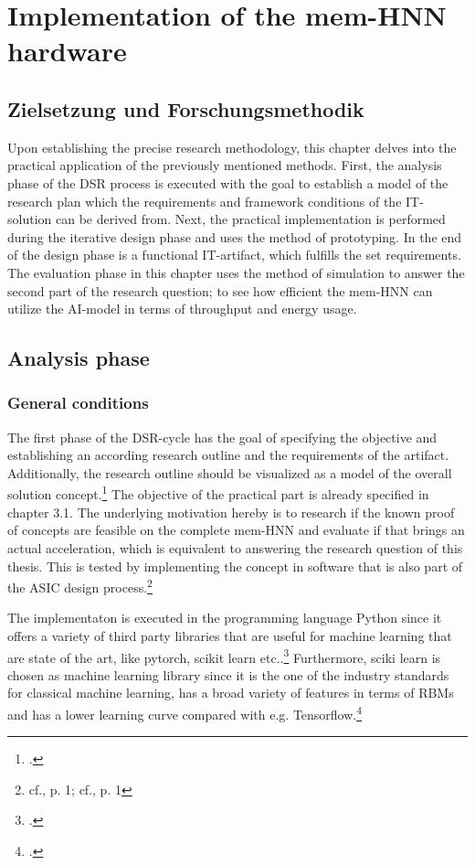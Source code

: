 \chapter{Implementation of the mem-HNN hardware}

\section{Zielsetzung und Forschungsmethodik}
Upon establishing the precise research methodology, this chapter delves into the practical application of the previously mentioned methods.
First, the analysis phase of the \ac{DSR} process is executed with the goal to establish a model of the research plan 
which the requirements and framework conditions of the \ac{IT}-solution can be derived from. 
Next, the practical implementation is performed during the iterative design phase and uses the method of prototyping.
In the end of the design phase is a functional \ac{IT}-artifact, which fulfills the set requirements.
The evaluation phase in this chapter uses the method of simulation to answer the second part of the research question; to see how efficient 
the \ac{mem-HNN} can utilize the AI-model in terms of throughput and energy usage.

\section{Analysis phase}
\subsection{General conditions}
The first phase of the \ac{DSR}-cycle has the goal of specifying the objective and establishing an according research outline and the requirements of the artifact.
Additionally, the research outline should be visualized as a model of the overall solution concept.\footcite[cf.][278-279]{oesterleKonsortialforschung2010}
The objective of the practical part is already specified in chapter 3.1.
The underlying motivation hereby is to research if the known proof of concepts are feasible on the complete \ac{mem-HNN}
and evaluate if that brings an actual acceleration, which is equivalent to answering the research question of this thesis. 
This is tested by implementing the concept in software that is also part of the ASIC design process.\footnote{cf.\cite{raoUltimateGuideASIC}, p. 1; cf.\cite{ASICDesignFlow}, p. 1}

The implementaton is executed in the programming language Python since it offers a variety of third party libraries that are useful 
for machine learning that are state of the art, like pytorch, scikit learn etc..\footcite[cf.][306-307]{DiscreteContinuousModels}
Furthermore, sciki learn is chosen as machine learning library since it is the one of the industry standards for classical machine learning, has a broad variety of features in terms of \ac{RBM}s
and has a lower learning curve compared with e.g. Tensorflow.\footcite[cf.][5-6]{raschkaMachineLearningPython2020}

